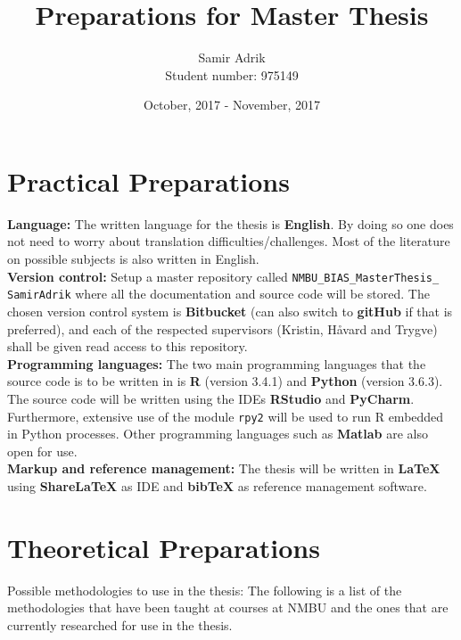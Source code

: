 \documentclass[../thesis/thesis.tex]{subfiles}
\title{\textbf{Preparations for Master Thesis}}
\author{\large Samir Adrik\\ \normalsize Student number: 975149}
\date{October, 2017 - November, 2017}
\begin{document}
\maketitle

\vspace{-1cm}\section{Practical Preparations}

\noindent \textbf{Language:} The written language for the thesis is \textbf{English}. By doing so one does not need to worry about translation difficulties/challenges. Most of the literature on possible subjects is also written in English.\\

\noindent \textbf{Version control:} Setup a master repository called \texttt{NMBU\_BIAS\_MasterThesis\_ SamirAdrik} where all the documentation and source code will be stored. The chosen version control system is \textbf{Bitbucket} (can also switch to \textbf{gitHub} if that is preferred), and each of the respected supervisors (Kristin, Håvard and Trygve) shall be given read access to this repository.\\

\noindent \textbf{Programming languages:} The two main programming languages that the source code is to be written in is \textbf{R} (version 3.4.1) and \textbf{Python} (version 3.6.3). The source code will be written using the IDEs \textbf{RStudio} and \textbf{PyCharm}. Furthermore, extensive use of the module \texttt{rpy2} \citep{gautier2008rpy2} will be used to run R embedded in Python processes. Other programming languages such as \textbf{Matlab} are also open for use.\\

\noindent \textbf{Markup and reference management:} The thesis will be written in \textbf{\LaTeX} $\!$ using \textbf{Share\LaTeX} as IDE and \textbf{bib\TeX} as reference management software.

\section{Theoretical Preparations}

\noindent Possible methodologies to use in the thesis: The following is a list of the methodologies that have been taught at courses at NMBU and the ones that are currently researched for use in the thesis.\\
\end{document}
